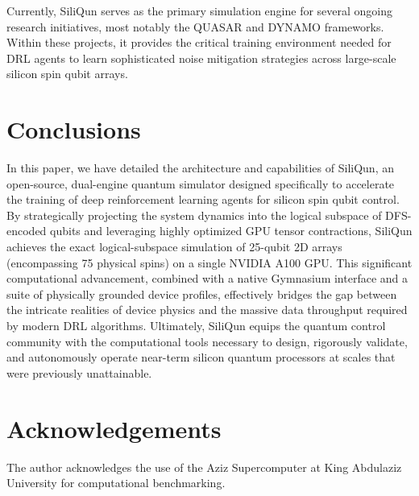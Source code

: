 \documentclass[preprint,12pt, a4paper]{elsarticle}
\begin{document}
Currently, SiliQun serves as the primary simulation engine for several ongoing research initiatives, most notably the QUASAR and DYNAMO frameworks. Within these projects, it provides the critical training environment needed for DRL agents to learn sophisticated noise mitigation strategies across large-scale silicon spin qubit arrays.

\section{Conclusions}
\label{sec:conclusions}

In this paper, we have detailed the architecture and capabilities of SiliQun, an open-source, dual-engine quantum simulator designed specifically to accelerate the training of deep reinforcement learning agents for silicon spin qubit control. By strategically projecting the system dynamics into the logical subspace of DFS-encoded qubits and leveraging highly optimized GPU tensor contractions, SiliQun achieves the exact logical-subspace simulation of 25-qubit 2D arrays (encompassing 75 physical spins) on a single NVIDIA A100 GPU. This significant computational advancement, combined with a native Gymnasium interface and a suite of physically grounded device profiles, effectively bridges the gap between the intricate realities of device physics and the massive data throughput required by modern DRL algorithms. Ultimately, SiliQun equips the quantum control community with the computational tools necessary to design, rigorously validate, and autonomously operate near-term silicon quantum processors at scales that were previously unattainable.

\section*{Acknowledgements}
The author acknowledges the use of the Aziz Supercomputer at King Abdulaziz University for computational benchmarking.
\end{document}
